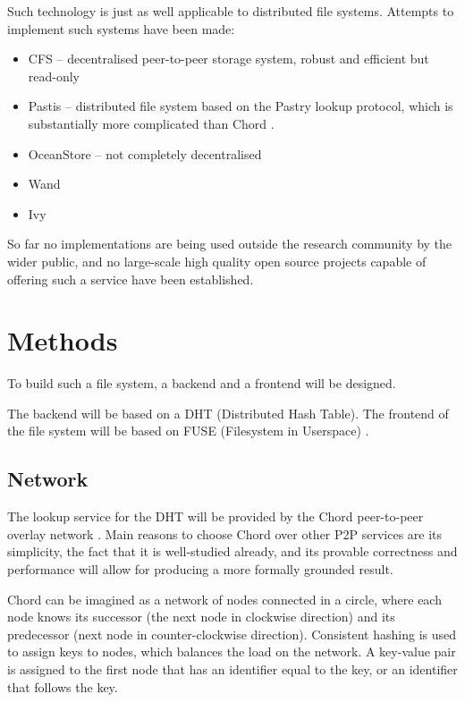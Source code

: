 \documentclass[8pt,a4paper]{article}
\begin{document}
Such technology is just as well applicable to distributed file systems. Attempts to implement such systems have been made:
\begin{itemize}
  \item CFS -- decentralised peer-to-peer storage system, robust and efficient but read-only
  \item Pastis -- distributed file system based on the Pastry lookup protocol, which is substantially more complicated than Chord \cite{chord}.
  \item OceanStore -- not completely decentralised
  \item Wand
  \item Ivy
\end{itemize}

So far no implementations are being used outside the research community by the wider public, and no large-scale high quality open source projects capable of offering such a service have been established.


\section{Methods}

To build such a file system, a backend and a frontend will be designed.

The backend will be based on a DHT (Distributed Hash Table). 
The frontend of the file system will be based on FUSE (Filesystem in Userspace) \cite{fuse}.

\subsection{Network}
The lookup service for the DHT will be provided by the Chord peer-to-peer overlay network \cite{chord}. Main reasons to choose Chord over other P2P services are its simplicity, the fact that it is well-studied already, and its provable correctness and performance will allow for producing a more formally grounded result. %

Chord can be imagined as a network of nodes connected in a circle, where each node knows its successor (the next node in clockwise direction) and its predecessor (next node in counter-clockwise direction). Consistent hashing is used to assign keys to nodes, which balances the load on the network. A key-value pair is assigned to the first node that has an identifier equal to the key, or an identifier that follows the key. 
\end{document}
